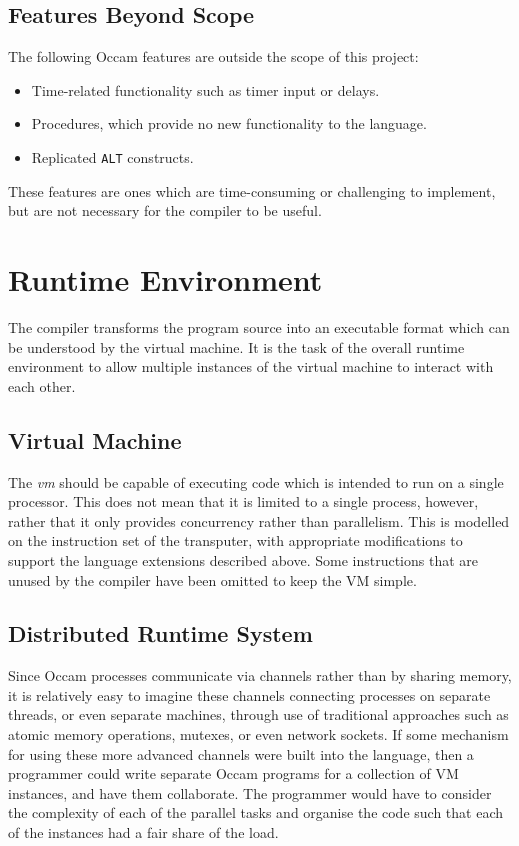 \subsection{Features Beyond Scope} \label{beyond-scope}

The following Occam features are outside the scope of this project:
\begin{itemize}
  \item Time-related functionality such as timer input or delays.
  \item Procedures, which provide no new functionality to the language.
  \item Replicated \texttt{ALT} constructs.
\end{itemize}
These features are ones which are time-consuming or challenging to implement,
but are not necessary for the compiler to be useful.

\section{Runtime Environment}

The compiler transforms the program source into an executable format which can
be understood by the virtual machine. It is the task of the overall runtime
environment to allow multiple instances of the virtual machine to interact with
each other.

\subsection{Virtual Machine} \label{vm}

The \textit{\gls{vm}} should be capable of executing code which is intended to
run on a single processor. This does not mean that it is limited to a single
process, however, rather that it only provides concurrency rather than
parallelism. This is modelled on the instruction set of the \gls{transputer},
with appropriate modifications to support the language extensions described
above. Some instructions that are unused by the compiler have been omitted to
keep the VM simple.

\subsection{Distributed Runtime System} \label{dist-system}

Since Occam processes communicate via channels rather than by sharing memory, it
is relatively easy to imagine these channels connecting processes on separate
threads, or even separate machines, through use of traditional approaches such
as atomic memory operations, mutexes, or even network sockets. If some mechanism
for using these more advanced channels were built into the language, then a
programmer could write separate Occam programs for a collection of VM instances,
and have them collaborate. The programmer would have to consider the complexity
of each of the parallel tasks and organise the code such that each of the
instances had a fair share of the load.


